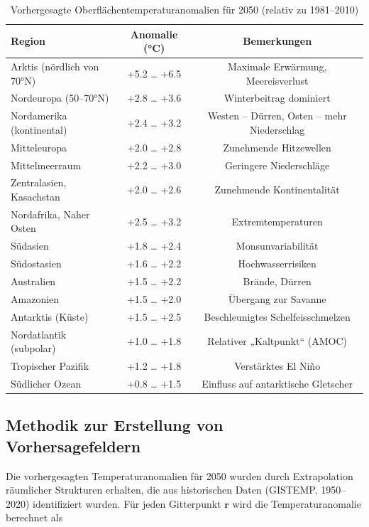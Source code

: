 \documentclass[12pt,a4paper]{article}
\begin{document}
	\begin{table}[htbp]
		\centering
		\caption{Vorhergesagte Oberflächentemperaturanomalien für 2050 (relativ zu 1981–2010)}
		\label{tab:anomalies_2050}
		\small
		\begin{tabular}{p{4.5cm} c c}
			\toprule
			Region & Anomalie (°C) & Bemerkungen \\
			\midrule
			Arktis (nördlich von 70°N) & +5.2 … +6.5 & Maximale Erwärmung, Meereisverlust \\
			Nordeuropa (50–70°N) & +2.8 … +3.6 & Winterbeitrag dominiert \\
			Nordamerika (kontinental) & +2.4 … +3.2 & Westen – Dürren, Osten – mehr Niederschlag \\
			Mitteleuropa & +2.0 … +2.8 & Zunehmende Hitzewellen \\
			Mittelmeerraum & +2.2 … +3.0 & Geringere Niederschläge \\
			Zentralasien, Kasachstan & +2.0 … +2.6 & Zunehmende Kontinentalität \\
			Nordafrika, Naher Osten & +2.5 … +3.2 & Extremtemperaturen \\
			Südasien & +1.8 … +2.4 & Monsunvariabilität \\
			Südostasien & +1.6 … +2.2 & Hochwasserrisiken \\
			Australien & +1.5 … +2.2 & Brände, Dürren \\
			Amazonien & +1.5 … +2.0 & Übergang zur Savanne \\
			Antarktis (Küste) & +1.5 … +2.5 & Beschleunigtes Schelfeisschmelzen \\
			Nordatlantik (subpolar) & +1.0 … +1.8 & Relativer „Kaltpunkt“ (AMOC) \\
			Tropischer Pazifik & +1.2 … +1.8 & Verstärktes El Niño \\
			Südlicher Ozean & +0.8 … +1.5 & Einfluss auf antarktische Gletscher \\
			\bottomrule
		\end{tabular}
	\end{table}
	
	\subsection{Methodik zur Erstellung von Vorhersagefeldern}
	
	Die vorhergesagten Temperaturanomalien für 2050 wurden durch Extrapolation räumlicher Strukturen erhalten, die aus historischen Daten (GISTEMP, 1950–2020) identifiziert wurden. Für jeden Gitterpunkt \(\mathbf{r}\) wird die Temperaturanomalie berechnet als
	
\end{document}
